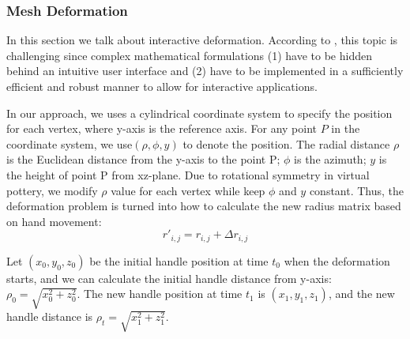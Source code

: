 \subsubsection{Mesh Deformation}
\label{sec:4.2.3}
In this section we talk about interactive deformation. According to \cite{botsch2010polygon}, this topic is challenging since complex mathematical formulations (1) have to be hidden behind an intuitive user interface and (2) have to be implemented in a sufficiently efficient and robust manner to allow for interactive applications.

In our approach, we uses a cylindrical coordinate system to specify the position for each vertex, where y-axis is the reference axis. For any point $P$ in the coordinate system, we use$(\rho, \phi, y)$ to denote the position. The radial distance $\rho$ is the Euclidean distance from the y-axis to the point P; $\phi$ is the azimuth; $y$ is the height of point P from xz-plane.
Due to rotational symmetry in virtual pottery, we modify $\rho$ value for each vertex while keep $\phi$ and $y$ constant. Thus, the deformation problem is turned into how to calculate the new radius matrix based on hand movement:
\begin{equation}
r'_{i,j} = r_{i,j} + \Delta r_{i,j}
\end{equation}

Let $(x_{0},y_{0},z_{0})$ be the initial handle position at time $t_{0}$ when the deformation starts, and we can calculate the initial handle distance from y-axis: $\rho_{0} = \sqrt{x_{0}^2 + z_{0}^2}$. The new handle position at time $t_{1}$ is $(x_{1},y_{1},z_{1})$, and the new handle distance is $\rho_{t} = \sqrt{x_{1}^2 + z_{1}^2}$.

